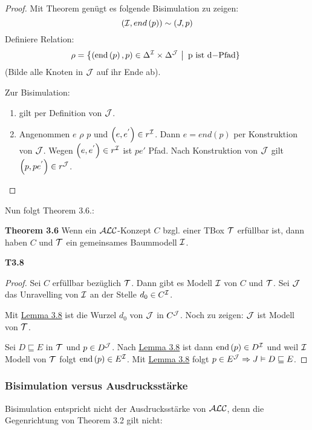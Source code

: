 \begin{proof}
Mit Theorem genügt es folgende Bisimulation zu zeigen:
$$\left( \mathcal{I},end\left( p \right) \right)\sim\left( J,p \right)$$ Definiere Relation: $$\rho = \left\{ \left( \text{end}\left( p \right),p \right) \in \Delta^{\MI} \times \Delta^{\MJ}\  \right|\text{\ p\ }\mathrm{\text{ist}}\text{\ d}\mathrm{- Pfad}\}\ $$(Bilde
alle Knoten in $\mathcal{J}$ auf ihr Ende ab). 

Zur Bisimulation:

\begin{enumerate}
\def\labelenumi{\arabic{enumi}.}
\item
  gilt per Definition von $\mathcal{J}$.
\item
  Angenommen $e$ $\rho$ $p$ und
  $\left( e,e^{'} \right) \in r^{\mathcal{I}}$. Dann $e = end\left( p \right)$
  per Konstruktion von $\mathcal{J}$. Wegen $\left( e,e^{'} \right) \in r^{\mathcal{I}}$
  ist $pe'$ Pfad. Nach Konstruktion von $\mathcal{J}$ gilt
  $\left( p,pe^{'} \right) \in r^{\mathcal{J}}$.
\end{enumerate}
\end{proof}

Nun folgt Theorem 3.6.:

\textbf{Theorem 3.6} Wenn ein $\mathcal{A}\mathcal{L}\mathcal{C}$-Konzept $C$ bzgl. einer TBox $\mathcal{T}$ erfüllbar ist, dann haben $C$ und $\mathcal{T}$ ein gemeinsames Baummodell $\mathcal{I}$.

\textbf{T3.8}
\begin{proof}
Sei $C$ erfüllbar bezüglich $\mathcal{T}$. Dann gibt es Modell $\mathcal{I}$ von $C$ und $\mathcal{T}$. Sei $\mathcal{J}$ das Unravelling von $\mathcal{I}$ an der Stelle
$d_0 \in C^{\mathcal{I}}$.

Mit \hyperlink{lemma37}{Lemma 3.8} ist die Wurzel $d_0$ von $\mathcal{J}$ in $C^{\mathcal{J}}$. Noch zu zeigen: $\mathcal{J}$ ist Modell von $\mathcal{T}$. 

Sei $D \sqsubseteq E$ in $\mathcal{T}$ und $p \in D^{\mathcal{J}}$. Nach \protect\hyperlink{lemma37}{Lemma 3.8} ist dann $\text{end}\left( p \right) \in D^{\mathcal{I}}$ und weil $\mathcal{I}$ Modell von $\mathcal{T}$ folgt $\text{end}\left( p \right) \in E^{\mathcal{I}}$. Mit \protect\hyperlink{lemma37}{Lemma 3.8} folgt $p \in E^{\mathcal{J}} \Rightarrow J \vDash D \sqsubseteq E$.
\end{proof}

\subsubsection{Bisimulation versus Ausdrucksstärke}\label{bisimulation-versus-ausdrucksstuxe4rke}

Bisimulation entspricht nicht der Ausdrucksstärke von $\mathcal{A}\mathcal{L}\mathcal{C}$, denn die Gegenrichtung von Theorem 3.2 gilt nicht:

